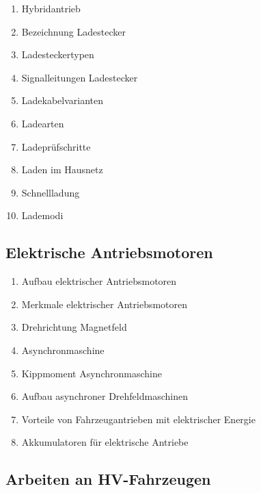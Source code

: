 \begin{enumerate}
\item
  Hybridantrieb\\
\item
  Bezeichnung Ladestecker\\
\item
  Ladesteckertypen\\
\item
  Signalleitungen Ladestecker\\
\item
  Ladekabelvarianten\\
\item
  Ladearten\\
\item
  Ladeprüfschritte\\
\item
  Laden im Hausnetz\\
\item
  Schnellladung\\
\item
  Lademodi
\end{enumerate}

\subsection{Elektrische
Antriebsmotoren}\label{elektrische-antriebsmotoren}

\begin{enumerate}
\item
  Aufbau elektrischer Antriebsmotoren\\
\item
  Merkmale elektrischer Antriebsmotoren\\
\item
  Drehrichtung Magnetfeld\\
\item
  Asynchronmaschine\\
\item
  Kippmoment Asynchronmaschine\\
\item
  Aufbau asynchroner Drehfeldmaschinen\\
\item
  Vorteile von Fahrzeugantrieben mit elektrischer Energie\\
\item
  Akkumulatoren für elektrische Antriebe
\end{enumerate}

\subsection{Arbeiten an HV-Fahrzeugen}\label{arbeiten-an-hv-fahrzeugen}

